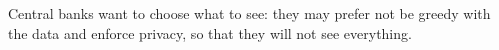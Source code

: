 \documentclass[runningheads]{llncs}
\begin{document}
Central banks want to choose what to see: they may prefer not be greedy with the data and enforce privacy, so that they will not see everything.

\newcommand{\tikzcircle}[2][black,fill=black]{\tikz[baseline=-0.5ex]\draw[#1,radius=#2] (0,0) circle ;}%

\newcommand*\halfcirc[1][1ex]{%
	\begin{tikzpicture}
	\draw[fill] (0,0)-- (90:#1) arc (90:270:#1) -- cycle ;
	\draw[thick] (0,0) circle (#1);
	\end{tikzpicture}}
% 
% 	
\end{document}
